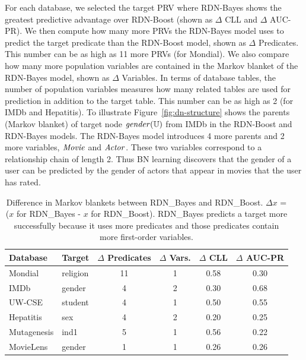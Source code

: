 \documentclass[runningheads,a4paper]{llncs}
\begin{document}
For each database, we selected the target PRV where RDN-Bayes shows the greatest predictive advantage over RDN-Boost (shown as $\Delta$ CLL and $\Delta$ AUC-PR). We then compute how many more PRVs the RDN-Bayes model uses to predict the target predicate than the RDN-Boost model, shown as $\Delta$ Predicates. This number can be as high as 11 more PRVs (for Mondial). We also compare how many more population variables are contained in the Markov blanket of the RDN-Bayes model, shown as $\Delta$ Variables. In terms of database tables, the number of population variables measures how many related tables are used for prediction in addition to the target table. This number can be as high as 2 (for IMDb and Hepatitis). To illustrate Figure~\ref{fig:dn-structure} shows the parents (Markov blanket) of target node $\it{gender}(\mathbb{U})$ from IMDb in the RDN-Boost and RDN-Bayes models. The RDN-Bayes model introduces 4 more parents and 2 more variables, $\it{Movie}$ and $\it{Actor}$. These two variables correspond to a relationship chain of length 2. Thus BN learning discovers that the gender of a user can be predicted by the gender of actors that appear in movies that the user has rated.
\begin{table}[!htb]
 \addtolength{\tabcolsep}{5pt}
 \caption{Difference in Markov blankets between RDN\_Bayes and RDN\_Boost. $\Delta x$ = ($x$ for RDN\_Bayes - $x$ for RDN\_Boost).  RDN\_Bayes predicts a target more successfully because it uses more  predicates and those predicates contain more first-order variables.}
      \centering
\begin{tabular}{l l c c c c}
\hline
Database & Target & $\Delta$ Predicates  & $\Delta$ Vars. & $\Delta$ CLL & $\Delta$ AUC-PR \\\hline
Mondial & religion & 11 & 1 & 0.58 & 0.30\\
IMDb & gender & 4 & 2 & 0.30 & 0.68 \\
UW-CSE & student & 4 & 1 & 0.50 & 0.55 \\
Hepatitis & sex & 4 & 2 & 0.20 & 0.25\\
Mutagenesis & ind1 & 5 & 1 & 0.56 & 0.22 \\
MovieLens & gender & 1 & 1 & 0.26 & 0.26 \\\hline
\end{tabular}
 \label{table:mb-comparison}%
\end{table}%
\end{document}
